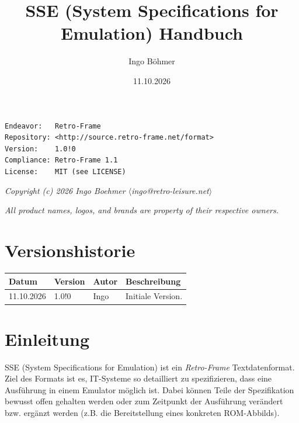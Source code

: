 \documentclass{scrartcl}
\title{SSE (System Specifications for Emulation) Handbuch}
\author{Ingo Böhmer}
\date{11.10.2026}
\begin{document}
\begin{titlepage}
\maketitle
\vspace{300pt}

\noindent \texttt{Endeavor:~~~Retro-Frame}\\
\noindent \texttt{Repository:~<http://source.retro-frame.net/format>}\\
\noindent \texttt{Version:~~~~1.0!0}\\
\noindent \texttt{Compliance:~Retro-Frame 1.1}\\
\noindent \texttt{License:~~~~MIT (see LICENSE)}

\vspace{10pt}
\noindent \textit{Copyright (c) 2026 Ingo Boehmer $\langle$ingo@retro-leisure.net$\rangle$}

\vspace{10pt}
\noindent \textit{All product names, logos, and brands are property of their respective owners.}

\newpage

\section*{Versionshistorie}

\vspace{10pt}
\begin{tabularx}{\textwidth}{|p{52pt}|p{42pt}|p{65pt}|X|}
\hline
\textbf{Datum} & \textbf{Version} & \textbf{Autor} & \textbf{Beschreibung}\\
\hline
11.10.2026 & 1.0!0 & Ingo & Initiale Version.\\
\hline
\end{tabularx}

\end{titlepage}

\newpage

\tableofcontents

\newpage

\section{Einleitung}

\noindent SSE (System Specifications for Emulation) ist ein \textit{Retro-Frame} Textdatenformat. Ziel des Formats ist es, IT-Systeme so detailliert zu spezifizieren, dass eine Ausführung in einem Emulator möglich ist. Dabei können Teile der Spezifikation bewusst offen gehalten werden oder zum Zeitpunkt der Ausführung verändert bzw. ergänzt werden (z.B. die Bereitstellung eines konkreten ROM-Abbilds).
\end{document}
